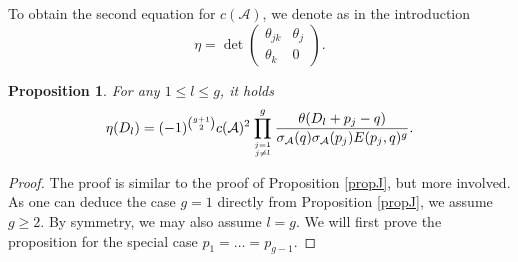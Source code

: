 \documentclass[pdftex]{sigma}
\numberwithin{equation}{section}
\newtheorem{Proposition}[Theorem]{Proposition}
 { \theoremstyle{definition}
\newtheorem{Definition}[Theorem]{Definition}
\newtheorem{Note}[Theorem]{Note}
\newtheorem{Example}[Theorem]{Example}
\newtheorem{Remark}[Theorem]{Remark} }
\newcommand\gf[2]{\genfrac{}{}{0pt}{}{#1}{#2}}
\begin{document}
To obtain the second equation for $c(\mathcal{A})$, we denote as in the introduction
\[\eta=\det\begin{pmatrix}\theta_{jk}&\theta_j\\ \theta_k &0 \end{pmatrix}.\]
\begin{Proposition}\label{propeta} For any $1\le l\le g$, it holds
	\[\eta(D_l)=(-1)^{\binom{g+1}{2}}c(\mathcal{A})^2\prod_{\gf{j=1}{j\neq l}}^{g}\frac{\theta(D_l+p_j-q)}{\sigma_{\mathcal{A}}(q)\sigma_{\mathcal{A}}(p_j)E(p_j,q)^g}.\]
\end{Proposition}
\begin{proof}
	The proof is similar to the proof of Proposition \ref{propJ}, but more involved. As one can deduce the case $g=1$ directly from Proposition \ref{propJ}, we assume $g\ge 2$.
	By symmetry, we may also assume $l=g$.
	We will first prove the proposition for the special case $p_1=\dots=p_{g-1}$.
	

\end{proof}
\end{document}
